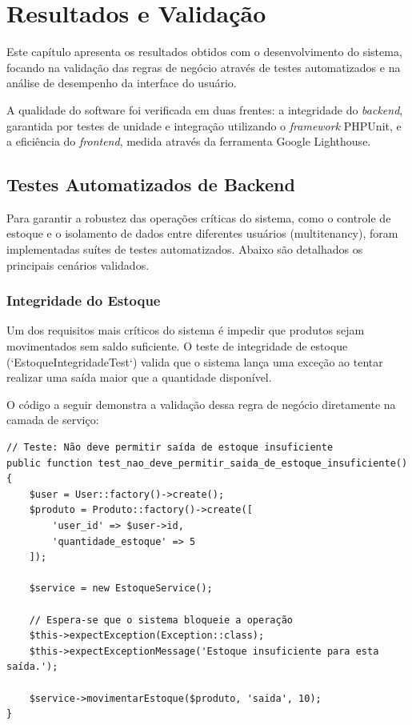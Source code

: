 \chapter{Resultados e Validação}
\label{cap:resultados}

Este capítulo apresenta os resultados obtidos com o desenvolvimento do sistema, focando na validação das regras de negócio através de testes automatizados e na análise de desempenho da interface do usuário.

A qualidade do software foi verificada em duas frentes: a integridade do \textit{backend}, garantida por testes de unidade e integração utilizando o \textit{framework} PHPUnit, e a eficiência do \textit{frontend}, medida através da ferramenta Google Lighthouse.

\section{Testes Automatizados de Backend}
\label{sec:testes-backend}

Para garantir a robustez das operações críticas do sistema, como o controle de estoque e o isolamento de dados entre diferentes usuários (multitenancy), foram implementadas suítes de testes automatizados. Abaixo são detalhados os principais cenários validados.

\subsection{Integridade do Estoque}

Um dos requisitos mais críticos do sistema é impedir que produtos sejam movimentados sem saldo suficiente. O teste de integridade de estoque (`EstoqueIntegridadeTest`) valida que o sistema lança uma exceção ao tentar realizar uma saída maior que a quantidade disponível.

O código a seguir demonstra a validação dessa regra de negócio diretamente na camada de serviço:

\begin{verbatim}
// Teste: Não deve permitir saída de estoque insuficiente
public function test_nao_deve_permitir_saida_de_estoque_insuficiente()
{
    $user = User::factory()->create();
    $produto = Produto::factory()->create([
        'user_id' => $user->id,
        'quantidade_estoque' => 5
    ]);

    $service = new EstoqueService();

    // Espera-se que o sistema bloqueie a operação
    $this->expectException(Exception::class);
    $this->expectExceptionMessage('Estoque insuficiente para esta saída.');

    $service->movimentarEstoque($produto, 'saida', 10);
}
\end{verbatim}

